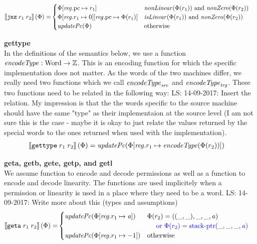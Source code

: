 \documentclass[a4paper]{article}
\newcommand\lau[1]{{\color{purple} \sf \footnotesize {LS: #1}}\\}
\newcommand{\sem}[1]{\left\llbracket #1 \right\rrbracket}
\newcommand{\tor}{\text{ or }}
\newcommand{\totherwise}{\text{otherwise }}
\newcommand{\sourcecolor}[1]{\color{blue}}
\newcommand{\src}[1]{{\sourcecolor{} #1}}
\newcommand{\targetcolor}[1]{\color{black}}
\newcommand{\trg}[1]{{\targetcolor{} #1}}
\newcommand{\zinstr}[1]{\texttt{#1}}
\newcommand{\twoinstr}[3]{
  \ifthenelse{\equal{#2#3}{}}
  {\zinstr{#1}}
  {\zinstr{#1} \; #2 \; #3}
}
\newcommand{\tjnz}[2]{\twoinstr{\trg{jnz}}{#1}{#2}}
\newcommand{\tisptr}[2]{\twoinstr{\trg{gettype}}{#1}{#2}}
\newcommand{\tgeta}[2]{\twoinstr{\trg{geta}}{#1}{#2}}
\newcommand{\ints}{\mathbb{Z}}
\newcommand{\update}[2]{[#1 \mapsto #2]}
\newcommand{\updReg}[2]{\update{\reg.#1}{#2}}
\newcommand{\shareddom}[1]{\mathrm{#1}}
\newcommand{\Word}{\shareddom{Word}}
\newcommand{\stkptr}[1]{\mathrm{stack\text{-}ptr}(#1)}
\newcommand{\var}[1]{\mathit{#1}}
\newcommand{\reg}{\var{reg}}
\newcommand{\aaddr}{\var{a}}
\newcommand{\pcreg}{\mathrm{pc}}
\newcommand{\plainfun}[2]{
  \ifthenelse{\equal{#2}{}}
  {\mathit{#1}}
  {\mathit{#1}(#2)}
}
\newcommand{\encType}[1]{\plainfun{encodeType}{#1}}
\newcommand{\updPcAddr}[1]{\plainfun{updatePc}{#1}}
\newcommand{\nonLinear}[1]{\plainfun{nonLinear}{#1}}
\newcommand{\isLinear}[1]{\plainfun{isLinear}{#1}}
\newcommand{\nonZero}[1]{\plainfun{nonZero}{#1}}
\begin{document}
\begin{align*}
  \sem{\tjnz{r_1}{r_2}}(\Phi) = &       
                             \begin{cases}
                               \Phi\updReg{\pcreg}{r_1} & \text{$\nonLinear{\Phi(r_1)}$ and $\nonZero{\Phi(r_2)}$} \\
                               \Phi\updReg{r_1}{0}\updReg{\pcreg}{\Phi(r_1)}
                                               & \text{$\isLinear{\Phi(r_1)}$ and $\nonZero{\Phi(r_2)}$}\\
                               \updPcAddr{\Phi} & \totherwise
                             \end{cases}
\end{align*}

\noindent\textbf{gettype}\\
In the definitions of the semantics below, we use a function $\encType{} : \Word \rightarrow \ints$. This is an encoding function for which the specific implementation does not matter. As the words of the two machines differ, we really need two functions which we call $\encType{}_{\var{src}}$ and $\encType{}_{\var{trg}}$. These two functions need to be related in the following way:
\lau{14-09-2017: Insert the relation. My impression is that the the words specific to the source machine should have the same "type" as their implementaion at the source level (I am not sure this is the case - maybe it is okay to just relate the values returned by the special words to the ones returned when used with the implementation). }
\begin{align*}
  \sem{\tisptr{r_1}{r_2}}(\Phi) = & \; \updPcAddr{}(\Phi\updReg{r_1}{\encType{\Phi(r_2)}})
\end{align*}


\noindent\textbf{geta, getb, gete, getp, and getl}\\
We assume function to encode and decode permissions as well as a function to encode and decode linearity. The functions are used implicitely when a permission or linearity is used in a place where they need to be a word.
\lau{14-09-2017: Write more about this (types and assumptions)}
\begin{align*}
  \sem{\tgeta{r_1}{r_2}}(\Phi) = & 
                                   \begin{cases}
                                     \updPcAddr{\Phi\updReg{r_1}{\aaddr}} & 
                                     \arraycolsep=0pt
                                     \begin{array}[t]{l}
                                       \Phi(r_2) = ((\_,\_),\_,\_,\aaddr) \\
                                       \quad \src{\tor \Phi(r_2) = \stkptr{\_,\_,\_,\aaddr} } \\
                                     \end{array} \\
                                     \updPcAddr{\Phi\updReg{r_1}{-1}} & \totherwise
                                   \end{cases}
\end{align*}
\end{document}
